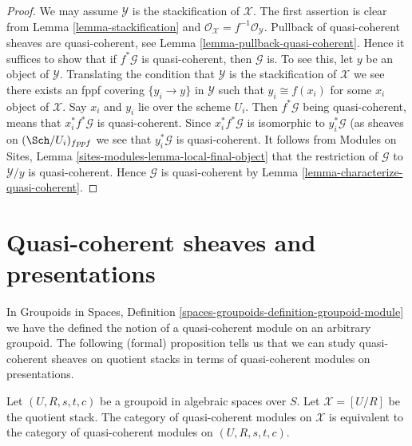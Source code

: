 \begin{proof}
We may assume $\mathcal{Y}$ is the stackification of $\mathcal{X}$.
The first assertion is clear from
Lemma \ref{lemma-stackification}
and
$\mathcal{O}_\mathcal{X} = f^{-1}\mathcal{O}_\mathcal{Y}$.
Pullback of quasi-coherent sheaves are quasi-coherent, see
Lemma \ref{lemma-pullback-quasi-coherent}.
Hence it suffices to show that if $f^*\mathcal{G}$ is
quasi-coherent, then $\mathcal{G}$ is.
To see this, let $y$ be an object of $\mathcal{Y}$.
Translating the condition that $\mathcal{Y}$ is the stackification
of $\mathcal{X}$ we see there exists an fppf covering $\{y_i \to y\}$
in $\mathcal{Y}$ such that $y_i \cong f(x_i)$ for some
$x_i$ object of $\mathcal{X}$. Say $x_i$ and $y_i$ lie over the scheme $U_i$.
Then $f^*\mathcal{G}$ being quasi-coherent, means that $x_i^*f^*\mathcal{G}$
is quasi-coherent. Since $x_i^*f^*\mathcal{G}$ is isomorphic to
$y_i^*\mathcal{G}$ (as sheaves on $(\Sch/U_i)_{fppf}$ we
see that $y_i^*\mathcal{G}$ is quasi-coherent.
It follows from
Modules on Sites, Lemma \ref{sites-modules-lemma-local-final-object}
that the restriction of $\mathcal{G}$ to $\mathcal{Y}/y$ is
quasi-coherent. Hence $\mathcal{G}$ is quasi-coherent by
Lemma \ref{lemma-characterize-quasi-coherent}.
\end{proof}





\section{Quasi-coherent sheaves and presentations}
\label{section-quasi-coherent-presentation}

\noindent
In
Groupoids in Spaces, Definition
\ref{spaces-groupoids-definition-groupoid-module}
we have the defined the notion of a quasi-coherent module
on an arbitrary groupoid. The following (formal) proposition tells us
that we can study quasi-coherent sheaves on quotient stacks in
terms of quasi-coherent modules on presentations.

\begin{proposition}
\label{proposition-quasi-coherent}
Let $(U, R, s, t, c)$ be a groupoid in algebraic spaces over $S$.
Let $\mathcal{X} = [U/R]$ be the quotient stack.
The category of quasi-coherent modules on $\mathcal{X}$
is equivalent to the category of quasi-coherent modules
on $(U, R, s, t, c)$.
\end{proposition}

